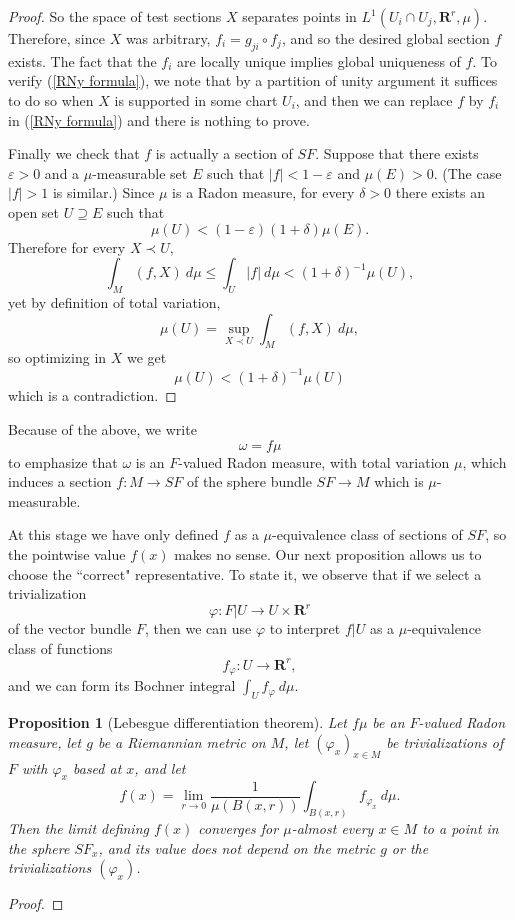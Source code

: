 \documentclass[reqno,12pt,letterpaper]{amsart}
\newcommand{\RR}{\mathbf{R}}
\newtheorem{proposition}[theorem]{Proposition}
\theoremstyle{definition}
\numberwithin{equation}{section}
\begin{document}
\begin{proof}
So the space of test sections $X$ separates points in $L^1(U_i \cap U_j, \RR^r, \mu)$.
Therefore, since $X$ was arbitrary, $f_i = g_{ji} \circ f_j$, and so the desired global section $f$ exists.
The fact that the $f_i$ are locally unique implies global uniqueness of $f$.
To verify (\ref{RNy formula}), we note that by a partition of unity argument it suffices to do so when $X$ is supported in some chart $U_i$, and then we can replace $f$ by $f_i$ in (\ref{RNy formula}) and there is nothing to prove.

Finally we check that $f$ is actually a section of $SF$.
Suppose that there exists $\varepsilon > 0$ and a $\mu$-measurable set $E$ such that $|f| < 1 - \varepsilon$ and $\mu(E) > 0$. (The case $|f| > 1$ is similar.)
Since $\mu$ is a Radon measure, for every $\delta > 0$ there exists an open set $U \supseteq E$ such that
$$\mu(U) < (1 - \varepsilon)(1 + \delta)\mu(E).$$
Therefore for every $X \prec U$,
$$\int_M (f, X) ~d\mu \leq \int_U |f| ~d\mu < (1 + \delta)^{-1}\mu(U),$$
yet by definition of total variation,
$$\mu(U) = \sup_{X \prec U} \int_M (f, X) ~d\mu,$$
so optimizing in $X$ we get
$$\mu(U) < (1 + \delta)^{-1}\mu(U)$$
which is a contradiction.
\end{proof}

Because of the above, we write
$$\omega = f\mu$$
to emphasize that $\omega$ is an $F$-valued Radon measure, with total variation $\mu$, which induces a section $f: M \to SF$ of the sphere bundle $SF \to M$ which is $\mu$-measurable.

At this stage we have only defined $f$ as a $\mu$-equivalence class of sections of $SF$, so the pointwise value $f(x)$ makes no sense.
Our next proposition allows us to choose the ``correct" representative.
To state it, we observe that if we select a trivialization
$$\varphi: F|U \to U \times \RR^r$$
of the vector bundle $F$, then we can use $\varphi$ to interpret $f|U$ as a $\mu$-equivalence class of functions
$$f_\varphi: U \to \RR^r,$$
and we can form its Bochner integral $\int_U f_\varphi ~d\mu$.

\begin{proposition}[Lebesgue differentiation theorem]
Let $f\mu$ be an $F$-valued Radon measure, let $g$ be a Riemannian metric on $M$, let $(\varphi_x)_{x \in M}$ be trivializations of $F$ with $\varphi_x$ based at $x$, and let
$$f(x) = \lim_{r \to 0} \frac{1}{\mu(B(x, r))} \int_{B(x, r)} f_{\varphi_x} ~d\mu.$$
Then the limit defining $f(x)$ converges for $\mu$-almost every $x \in M$ to a point in the sphere $SF_x$, and its value does not depend on the metric $g$ or the trivializations $(\varphi_x)$.
\end{proposition}
\begin{proof}

\end{proof}
\end{document}
